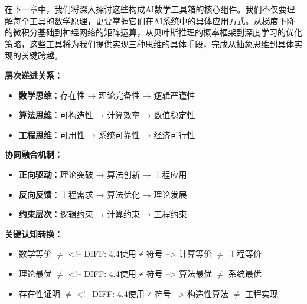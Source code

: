 在下一章中，我们将深入探讨这些构成AI数学工具箱的核心组件。我们不仅要理解每个工具的数学原理，更要掌握它们在AI系统中的具体应用方式。从梯度下降的微积分基础到神经网络的矩阵运算，从贝叶斯推理的概率框架到深度学习的优化策略，这些工具将为我们提供实现三种思维的具体手段，完成从抽象思维到具体实现的关键跨越。

\begin{tcolorbox}[colback=blue!5!white,colframe=blue!75!black,title=核心要点：三种思维的层次递进与协同融合]
\textbf{层次递进关系：}
\begin{itemize}
\item \textbf{数学思维}：存在性 → 理论完备性 → 逻辑严谨性
\item \textbf{算法思维}：可构造性 → 计算效率 → 数值稳定性
\item \textbf{工程思维}：可用性 → 系统可靠性 → 经济可行性
\end{itemize}

\textbf{协同融合机制：}
\begin{itemize}
\item \textbf{正向驱动}：理论突破 → 算法创新 → 工程应用
\item \textbf{反向反馈}：工程需求 → 算法优化 → 理论发展
\item \textbf{约束层次}：逻辑约束 → 计算约束 → 工程约束
\end{itemize}

\textbf{关键认知转换：}
\begin{itemize}
\item 数学等价 $\neq$ <!-- DIFF: 4.4使用 ≠ 符号 --> 计算等价 $\neq$ 工程等价
\item 理论最优 $\neq$ <!-- DIFF: 4.4使用 ≠ 符号 --> 算法最优 $\neq$ 系统最优
\item 存在性证明 $\neq$ <!-- DIFF: 4.4使用 ≠ 符号 --> 构造性算法 $\neq$ 工程实现
\end{itemize}
\end{tcolorbox}
